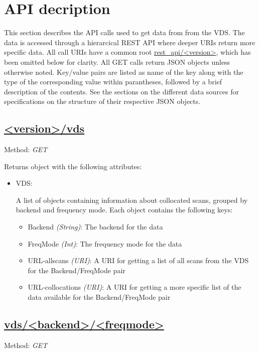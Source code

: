 \chapter{API decription}
\label{sec:api}
This section describes the API calls used to get data from from the VDS.  The
data is accessed through a hierarcical REST API where deeper URIs return more
specific data.  All call URIs have a common root \url{rest_api/<version>}, which
has been omitted below for clarity.  All GET calls return JSON objects unless
otherwise noted. Key/value pairs are listed as name of the key
along with the type of the corresponding value within parantheses, followed
by a brief description of the contents.  See the sections on the different
data sources for specifications on the structure of their respective JSON
objects.


\section{\url{<version>/vds}}
Method: \emph{GET}

Returns object with the following attributes:
\begin{itemize}
    \item VDS:

        A list of objects containing information about collocated scans,
        grouped by backend and frequency mode.
        Each object contains the following keys:

        \begin{itemize}
            \item Backend \emph{(String)}: The backend for the data
            \item FreqMode \emph{(Int)}: The frequency mode for the data
            \item URL-allscans \emph{(URI)}: A URI for getting a list of all
                scans from the VDS for the Backend/FreqMode pair
            \item URL-collocations \emph{(URI)}: A URI for getting a more
                specific list of the data available for the Backend/FreqMode
                pair
        \end{itemize}
\end{itemize}


\section{\url{vds/<backend>/<freqmode>}}
Method: \emph{GET}

